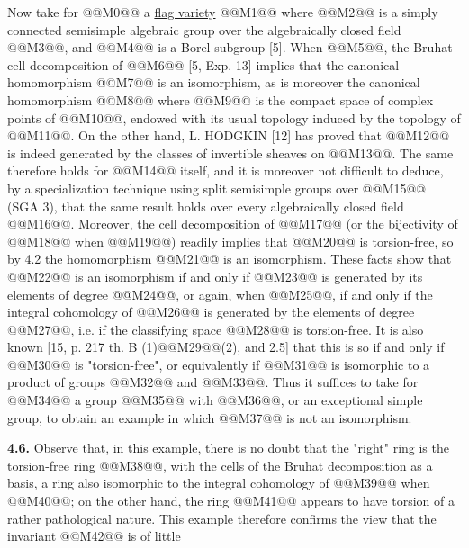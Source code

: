 Now take for @@M0@@ a \uline{flag variety}
@@M1@@
where @@M2@@ is a simply connected semisimple algebraic group over the algebraically closed field @@M3@@, and @@M4@@ is a Borel subgroup [5]. When @@M5@@, the Bruhat cell decomposition of @@M6@@ [5, Exp. 13] implies that the canonical homomorphism
@@M7@@
is an isomorphism, as is moreover the canonical homomorphism
@@M8@@
where @@M9@@ is the compact space of complex points of @@M10@@, endowed with its usual topology induced by the topology of @@M11@@. On the other hand, L. HODGKIN [12] has proved that @@M12@@ is indeed generated by the classes of invertible sheaves on @@M13@@. The same therefore holds for @@M14@@ itself, and it is moreover not difficult to deduce, by a specialization technique using split semisimple groups over @@M15@@ (SGA 3), that the same result holds over every algebraically closed field @@M16@@. Moreover, the cell decomposition of @@M17@@ (or the bijectivity of @@M18@@ when @@M19@@) readily implies that @@M20@@ is torsion-free, so by 4.2 the homomorphism @@M21@@ is an isomorphism. These facts show that @@M22@@ is an isomorphism if and only if @@M23@@ is generated by its elements of degree @@M24@@, or again, when @@M25@@, if and only if the integral cohomology of @@M26@@ is generated by the elements of degree @@M27@@, i.e. if the classifying space @@M28@@ is torsion-free. It is also known [15, p. 217 th. B (1)@@M29@@(2), and 2.5] that this is so if and only if @@M30@@ is "torsion-free", or equivalently if @@M31@@ is isomorphic to a product of groups @@M32@@ and @@M33@@. Thus it suffices to take for @@M34@@ a group @@M35@@ with @@M36@@, or an exceptional simple group, to obtain an example in which @@M37@@ is not an isomorphism.

\textbf{4.6.} Observe that, in this example, there is no doubt that the "right" ring is the torsion-free ring @@M38@@, with the cells of the Bruhat decomposition as a basis, a ring also isomorphic to the integral cohomology of @@M39@@ when @@M40@@; on the other hand, the ring @@M41@@ appears to have torsion of a rather pathological nature. This example therefore confirms the view that the invariant @@M42@@ is of little
